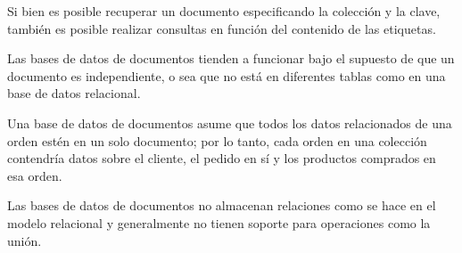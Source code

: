 Si bien es posible recuperar un documento especificando la colección y la clave, también es posible realizar consultas en función del contenido de las etiquetas.


Las bases de datos de documentos tienden a funcionar bajo el supuesto de que un documento es independiente, o sea que no está en diferentes tablas como en una base de datos relacional.


Una base de datos de documentos asume que todos los datos relacionados de una orden estén en un solo documento; por lo tanto, cada orden en una colección contendría datos sobre el cliente, el pedido en sí y los productos comprados en esa orden.


Las bases de datos de documentos no almacenan relaciones como se hace en el modelo relacional y generalmente no tienen soporte para operaciones como la unión.